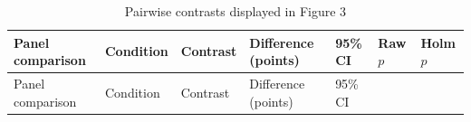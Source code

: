 \documentclass[
  letterpaper,
  DIV=11,
  numbers=noendperiod]{scrartcl}
\begin{document}
\begin{longtable}[]{@{}
  >{\raggedright\arraybackslash}p{}
  >{\raggedright\arraybackslash}p{}
  >{\raggedright\arraybackslash}p{}
  >{\raggedleft\arraybackslash}p{}
  >{\raggedright\arraybackslash}p{}
  >{\raggedleft\arraybackslash}p{}
  >{\raggedleft\arraybackslash}p{}@{}}
\caption{Pairwise contrasts displayed in Figure
3}\label{tbl-figure3-pairwise}\tabularnewline
\toprule\noalign{}
\begin{minipage}[b]{\linewidth}\raggedright
Panel comparison
\end{minipage} & \begin{minipage}[b]{\linewidth}\raggedright
Condition
\end{minipage} & \begin{minipage}[b]{\linewidth}\raggedright
Contrast
\end{minipage} & \begin{minipage}[b]{\linewidth}\raggedleft
Difference (points)
\end{minipage} & \begin{minipage}[b]{\linewidth}\raggedright
95\% CI
\end{minipage} & \begin{minipage}[b]{\linewidth}\raggedleft
Raw \(p\)
\end{minipage} & \begin{minipage}[b]{\linewidth}\raggedleft
Holm \(p\)
\end{minipage} \\
\midrule\noalign{}
\endfirsthead
\toprule\noalign{}
\begin{minipage}[b]{\linewidth}\raggedright
Panel comparison
\end{minipage} & \begin{minipage}[b]{\linewidth}\raggedright
Condition
\end{minipage} & \begin{minipage}[b]{\linewidth}\raggedright
Contrast
\end{minipage} & \begin{minipage}[b]{\linewidth}\raggedleft
Difference (points)
\end{minipage} & \begin{minipage}[b]{\linewidth}\raggedright
95\% CI

\end{minipage}
\end{longtable}
\end{document}
